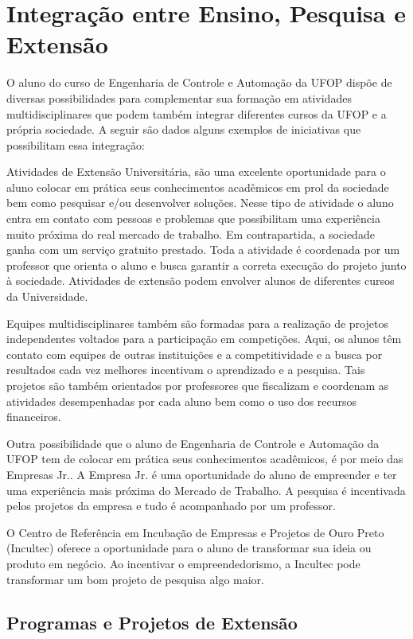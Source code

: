 \section{Integração entre Ensino, Pesquisa e Extensão}

O aluno do curso de Engenharia de Controle e Automação da UFOP dispõe de diversas possibilidades para complementar sua formação em atividades multidisciplinares que podem também integrar diferentes cursos da UFOP e a própria sociedade. A seguir são dados alguns exemplos de iniciativas que possibilitam essa integração:

Atividades de Extensão Universitária, são uma excelente oportunidade para o aluno colocar em prática seus conhecimentos acadêmicos em prol da sociedade bem como pesquisar e/ou desenvolver soluções. Nesse tipo de atividade o aluno entra em contato com pessoas e problemas que possibilitam uma experiência muito próxima do real mercado de trabalho. Em contrapartida, a sociedade ganha com um serviço gratuito prestado. Toda a atividade é coordenada por um professor que orienta o aluno e busca garantir a correta execução do projeto junto à sociedade. Atividades de extensão podem envolver alunos de diferentes cursos da Universidade.

Equipes multidisciplinares também são formadas para a realização de projetos independentes voltados para a participação em competições. Aqui, os alunos têm contato com equipes de outras instituições e a competitividade e a busca por resultados cada vez melhores incentivam o aprendizado e a pesquisa. Tais projetos são também orientados por professores que fiscalizam e coordenam as atividades desempenhadas por cada aluno bem como o uso dos recursos financeiros.

Outra possibilidade que o aluno de Engenharia de Controle e Automação da UFOP tem de colocar em prática seus conhecimentos acadêmicos, é por meio das Empresas Jr.. A Empresa Jr. é uma oportunidade do aluno de empreender e ter uma experiência mais próxima do Mercado de Trabalho. A pesquisa é incentivada pelos projetos da empresa e tudo é acompanhado por um professor.

O Centro de Referência em Incubação de Empresas e Projetos de Ouro Preto (Incultec) oferece a oportunidade para o aluno de transformar sua ideia ou produto em negócio. Ao incentivar o empreendedorismo, a Incultec pode transformar um bom projeto de pesquisa algo maior.

\subsection*{Programas e Projetos de Extensão}

